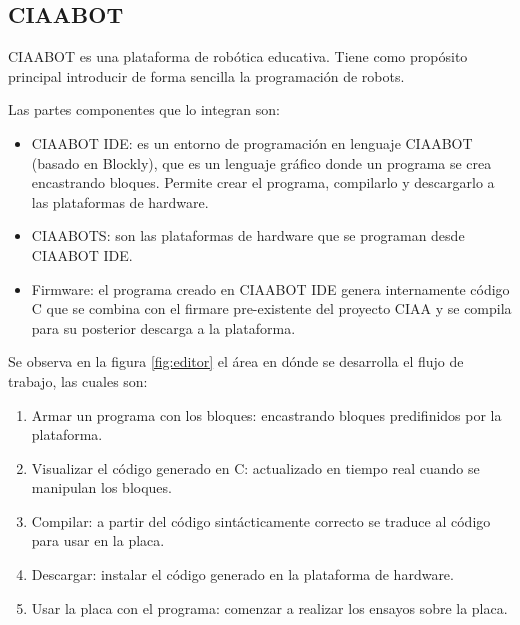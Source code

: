 \subsection{CIAABOT}
\label{CIAABOT}

CIAABOT es una plataforma de robótica educativa. Tiene como propósito principal introducir
de forma sencilla la programación de robots.

Las partes componentes que lo integran son:

\begin{itemize}
	\item CIAABOT IDE: es un entorno de programación en lenguaje CIAABOT (basado en  Blockly\citep{blockly}), que es un lenguaje gráfico donde un programa se crea encastrando bloques. Permite crear el programa, compilarlo y descargarlo a las plataformas de hardware.
	\item CIAABOTS: son las plataformas de hardware que se programan desde CIAABOT IDE. 
	\item Firmware: el programa creado en CIAABOT IDE genera internamente código C que se combina con el firmare pre-existente del proyecto CIAA y se compila para su posterior descarga a la plataforma.
\end{itemize}

Se observa en la figura \ref{fig:editor} el área en dónde se desarrolla el flujo de trabajo, las cuales son:

\begin{enumerate}
	\item Armar un programa con los bloques: encastrando bloques predifinidos por
	la plataforma.	
	\item Visualizar el código generado en C: actualizado en tiempo real cuando se
	manipulan los bloques.
	\item Compilar: a partir del código sintácticamente correcto se traduce al código
	para usar en la placa.
	\item Descargar: instalar el código generado en la plataforma de hardware.
	\item Usar la placa con el programa: comenzar a realizar los ensayos sobre la placa.
\end{enumerate}

